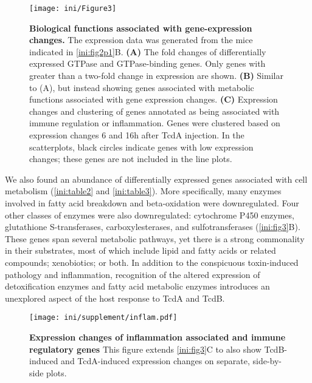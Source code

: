 \begin{figure*}
  \centering
  \texttt{[image: ini/Figure3]}
  \caption[Biological functions associated with gene-expression changes]{
       \textbf{Biological functions associated with gene-expression changes.}
       The expression data was generated from the mice indicated 
       in \autoref{ini:fig2p1}B. \textbf{(A)} The fold changes of 
       differentially expressed GTPase and GTPase-binding genes. 
       Only genes with greater than a two-fold change in expression 
       are shown. \textbf{(B)} Similar to (A), but instead showing 
       genes associated with metabolic functions associated with gene 
       expression changes. \textbf{(C)} Expression changes and clustering 
       of genes annotated as being associated with immune regulation 
       or inflammation. Genes were clustered based on expression 
       changes 6 and 16h after TcdA injection. In the scatterplots, 
       black circles indicate genes with low expression changes; 
       these genes are not included in the line plots.
  }
  \label{ini:fig3}
\end{figure*}


We also found an abundance of differentially expressed genes 
associated with cell metabolism (\autoref{ini:table2} and 
\autoref{ini:table3}). More specifically, many enzymes involved 
in fatty acid breakdown and beta-oxidation were downregulated. 
Four other classes of enzymes were also downregulated: cytochrome 
P450 enzymes, glutathione S-transferases, carboxylesterases, and 
sulfotransferases (\autoref{ini:fig3}B). These genes span several 
metabolic pathways, yet there is a strong commonality in their 
substrates, most of which include lipid and fatty acids or related 
compounds; xenobiotics; or both. In addition to the conspicuous 
toxin-induced pathology and inflammation, recognition of the altered 
expression of detoxification enzymes and fatty acid metabolic 
enzymes introduces an unexplored aspect of the host response to 
TcdA and TcdB.

\begin{figure}[t!]
  \centering
    \texttt{[image: ini/supplement/inflam.pdf]}
  \caption[Expression changes of inflammation associated
           and immune regulatory genes]{\textbf{Expression changes of inflammation associated
           and immune regulatory genes}
           This figure extends \autoref{ini:fig3}C to also
show TcdB-induced and TcdA-induced expression changes on separate, side-by-side
plots.}
  \label{ini:fig:inflam}
\end{figure}

